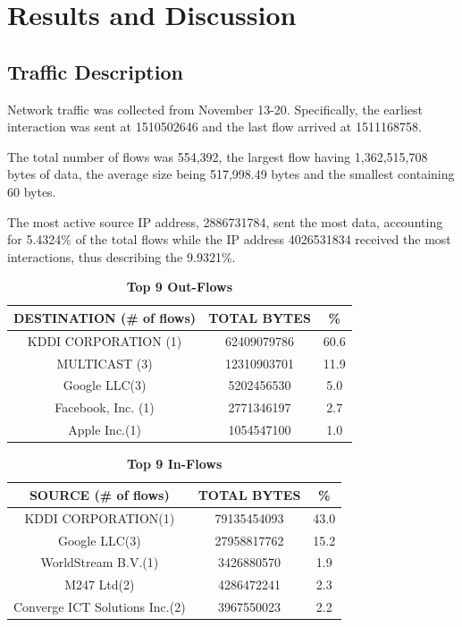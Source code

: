 \documentclass[journal]{IEEE/IEEEtran}
\begin{document}
\section{Results and Discussion}

\subsection{Traffic Description}

Network traffic was collected from November 13-20. Specifically, the earliest interaction was sent at 1510502646 and the last flow arrived at 1511168758.

The total number of flows was 554,392, the largest flow having 1,362,515,708 bytes of data, the average size being 517,998.49 bytes and the smallest containing 60 bytes.

The most active source IP address, 2886731784, sent  the most data, accounting for 5.4324\% of the total flows while the IP address 4026531834 received the most interactions, thus describing the 9.9321\%.

\begin{table}[ht]
\centering
\caption{\textbf{Top 9 Out-Flows}}
\label{top-out-flows}
\begin{tabular}{|c|c|c|}
\hline
\textbf{DESTINATION (\# of flows)} 		& \textbf{TOTAL BYTES} 	& \textbf{\%} \\ \hline
	KDDI CORPORATION (1)				&  62409079786			& 60.6        \\ \hline
	MULTICAST (3)						&  12310903701          & 11.9        \\ \hline
	Google LLC(3)						&  5202456530           & 5.0         \\ \hline
	Facebook, Inc. (1)					&  2771346197           & 2.7         \\ \hline	
	Apple Inc.(1)						&  1054547100           & 1.0         \\ \hline
\end{tabular}
\end{table}

\begin{table}[ht]
\centering
\caption{\textbf{Top 9 In-Flows}}
\label{top-in-flows}
\begin{tabular}{|c|c|c|}
\hline
\textbf{SOURCE (\# of flows)} 		& \textbf{TOTAL BYTES} 	& \textbf{\%} \\ \hline
    KDDI CORPORATION(1)				&  79135454093			& 43.0        \\ \hline
    Google LLC(3)					&  27958817762          & 15.2        \\ \hline
    WorldStream B.V.(1)				&  3426880570           & 1.9         \\ \hline
    M247 Ltd(2)						&  4286472241           & 2.3         \\ \hline
    Converge ICT Solutions Inc.(2)	&  3967550023			& 2.2         \\ \hline    
\end{tabular}
\end{table}
\end{document}
